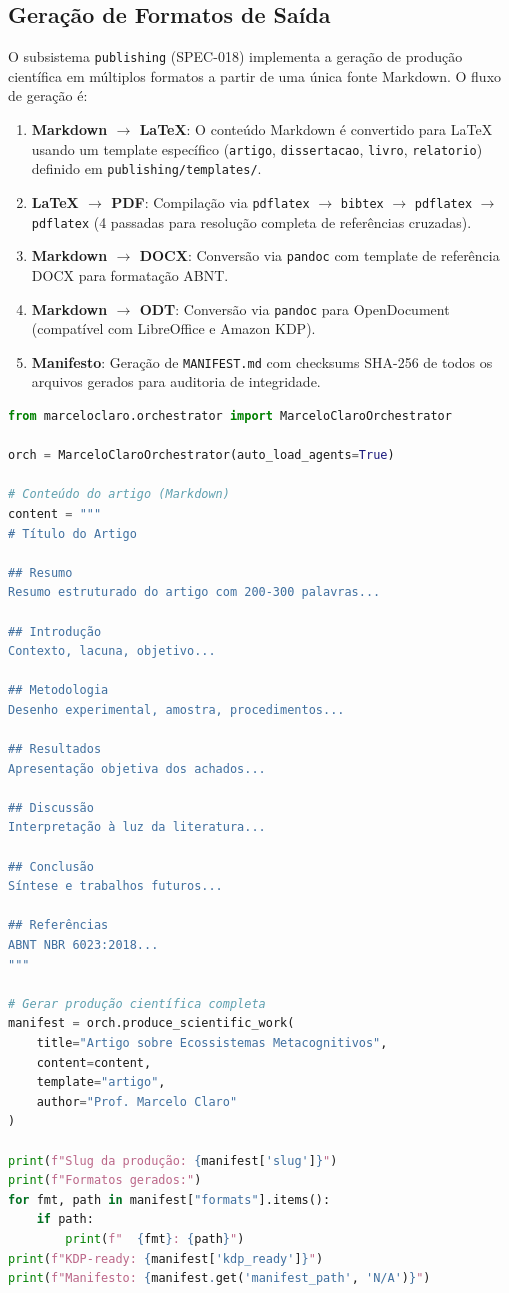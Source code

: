 \subsection{Geração de Formatos de Saída}
\label{sec:formatos-saida}

O subsistema \texttt{publishing} (SPEC-018) implementa a geração de produção científica em múltiplos formatos a partir de uma única fonte Markdown. O fluxo de geração é:

\begin{enumerate}
  \item \textbf{Markdown $\to$ LaTeX}: O conteúdo Markdown é convertido para LaTeX usando um template específico (\texttt{artigo}, \texttt{dissertacao}, \texttt{livro}, \texttt{relatorio}) definido em \texttt{publishing/templates/}.
  \item \textbf{LaTeX $\to$ PDF}: Compilação via \texttt{pdflatex} $\to$ \texttt{bibtex} $\to$ \texttt{pdflatex} $\to$ \texttt{pdflatex} (4 passadas para resolução completa de referências cruzadas).
  \item \textbf{Markdown $\to$ DOCX}: Conversão via \texttt{pandoc} com template de referência DOCX para formatação ABNT.
  \item \textbf{Markdown $\to$ ODT}: Conversão via \texttt{pandoc} para OpenDocument (compatível com LibreOffice e Amazon KDP).
  \item \textbf{Manifesto}: Geração de \texttt{MANIFEST.md} com checksums SHA-256 de todos os arquivos gerados para auditoria de integridade.
\end{enumerate}

\begin{lstlisting}[language=python,caption={Geração completa de formatos de publicação},label={lst:publish-formats}]
from marceloclaro.orchestrator import MarceloClaroOrchestrator

orch = MarceloClaroOrchestrator(auto_load_agents=True)

# Conteúdo do artigo (Markdown)
content = """
# Título do Artigo

## Resumo
Resumo estruturado do artigo com 200-300 palavras...

## Introdução
Contexto, lacuna, objetivo...

## Metodologia
Desenho experimental, amostra, procedimentos...

## Resultados
Apresentação objetiva dos achados...

## Discussão
Interpretação à luz da literatura...

## Conclusão
Síntese e trabalhos futuros...

## Referências
ABNT NBR 6023:2018...
"""

# Gerar produção científica completa
manifest = orch.produce_scientific_work(
    title="Artigo sobre Ecossistemas Metacognitivos",
    content=content,
    template="artigo",
    author="Prof. Marcelo Claro"
)

print(f"Slug da produção: {manifest['slug']}")
print(f"Formatos gerados:")
for fmt, path in manifest["formats"].items():
    if path:
        print(f"  {fmt}: {path}")
print(f"KDP-ready: {manifest['kdp_ready']}")
print(f"Manifesto: {manifest.get('manifest_path', 'N/A')}")
\end{lstlisting}

